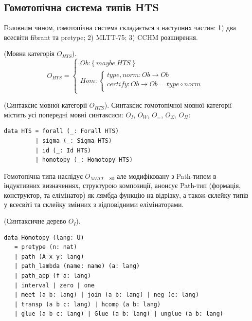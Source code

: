 \newpage
\subsection{Гомотопічна система типів HTS}

Головним чином, гомотопічна система складається з наступних частин:
1) два всесвіти fibrant та pretype;
2) MLTT-75;
3) CCHM розширення.

\begin{definition} (Мовна категорія $O_{HTS}$).
$$
O_{HTS} =
\begin{cases}
Ob: \{\ maybe\ HTS\ \} \\
Hom: \begin{cases}
type,norm: Ob \rightarrow Ob \\
certify: Ob \rightarrow Ob = type \circ norm \\
\end{cases}
\end{cases}
$$
\end{definition}

\begin{definition} (Синтаксис мовної категорії $O_{HTS}$).
Синтаксис гомотопічної мовної категорії містить усі
попередні мовні синтаксиси: $O_I$, $O_W$, $O_=$, $O_\Sigma$, $O_\Pi$:
\begin{lstlisting}
data HTS = forall (_: Forall HTS)
         | sigma (_: Sigma HTS)
         | id (_: Id HTS)
         | homotopy (_: Homotopy HTS)
\end{lstlisting}
\end{definition}

Гомотопічна типа наслідує $O_{MLTT-80}$ але модифіковану з
Path-типом в індуктивних визначеннях, структурою композиції,
анонсує Path-тип (формація, конструктор, та елімінатор)
як лямбда функцію на відрізку, а також склейку типів у всесвіті
та склейку змінних з відповідними елімінаторами.

\begin{definition} (Синтаксичне дерево $O_I$).
\begin{lstlisting}
data Homotopy (lang: U)
   = pretype (n: nat)
   | path (A x y: lang)
   | path_lambda (name: name) (a: lang)
   | path_app (f a: lang)
   | interval | zero | one
   | meet (a b: lang) | join (a b: lang) | neg (e: lang)
   | transp (a b c: lang) | hcomp (a b: lang)
   | glue (a b c: lang) | Glue (a b: lang) | unglue (a b: lang)
\end{lstlisting}
\end{definition}

